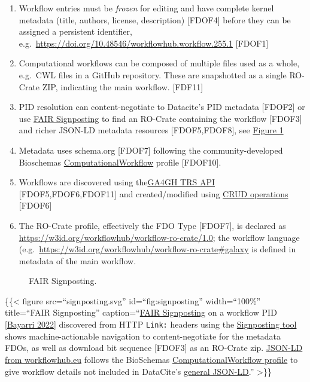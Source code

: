 \begin{enumerate}
\def\labelenumi{\arabic{enumi}.}
\tightlist
\item
  Workflow entries must be \emph{frozen} for editing and have complete
  kernel metadata (title, authors, license, description) {[}FDOF4{]}
  before they can be assigned a persistent identifier,
  e.g.~\url{https://doi.org/10.48546/workflowhub.workflow.255.1}
  {[}FDOF1{]}
\item
  Computational workflows can be composed of multiple files used as a
  whole, e.g.~CWL files in a GitHub repository. These are snapshotted as
  a single RO-Crate ZIP, indicating the main workflow. {[}FDF11{]}
\item
  PID resolution can content-negotiate to Datacite's PID metadata
  {[}FDOF2{]} or use \href{https://signposting.org/FAIR/}{FAIR
  Signposting} to find an RO-Crate containing the workflow {[}FDOF3{]}
  and richer JSON-LD metadata resources {[}FDOF5,FDOF8{]}, see
  \protect\hyperlink{fig:signposting}{Figure 1}
\item
  Metadata uses schema.org {[}FDOF7{]} following the community-developed
  Bioschemas
  \href{https://bioschemas.org/profiles/ComputationalWorkflow/1.0-RELEASE}{ComputationalWorkflow}
  profile {[}FDOF10{]}.
\item
  Workflows are discovered using
  the\href{https://about.workflowhub.eu/developer/trs/}{GA4GH TRS API}
  {[}FDOF5,FDOF6,FDOF11{]} and created/modified using
  \href{https://workflowhub.eu/api}{CRUD operations} {[}FDOF6{]}
\item
  The RO-Crate profile, effectively the FDO Type {[}FDOF7{]}, is
  declared as \url{https://w3id.org/workflowhub/workflow-ro-crate/1.0};
  the workflow language
  (e.g.~\url{https://w3id.org/workflowhub/workflow-ro-crate\#galaxy} is
  defined in metadata of the main workflow.
\end{enumerate}

\begin{figure}
  \centering
  \caption{FAIR Signposting.}
  \label{fig:signposting}
\end{figure} 


\{\{\textless{} figure src=``signposting.svg'' id=``fig:signposting''
width=``100\%'' title=``FAIR Signposting''
caption=``\href{https://signposting.org/FAIR/}{FAIR Signposting} on a
workflow PID
{[}\href{https://doi.org/10.48546/workflowhub.workflow.255.1}{Bayarri
2022}{]} discovered from HTTP \texttt{Link:} headers using the
\href{https://pypi.org/project/signposting/}{Signposting tool} shows
machine-actionable navigation to content-negotiate for the metadata
FDOs, as well as download bit sequence {[}FDOF3{]} as an RO-Crate zip.
\href{https://workflowhub.eu/workflows/255.jsonld}{JSON-LD from
workflowhub.eu} follows the BioSchemas
\href{https://bioschemas.org/profiles/ComputationalWorkflow/1.0-RELEASE}{ComputationalWorkflow
profile} to give workflow details not included in DataCite's
\href{https://data.crosscite.org/application/ld+json/10.48546/workflowhub.workflow.255.1}{general
JSON-LD}.'' \textgreater\}\}


